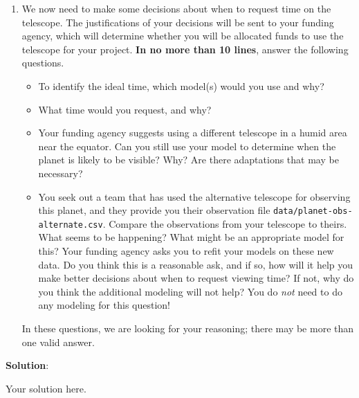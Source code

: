 \documentclass[submit]{../harvardml}
\newenvironment{solution}{
    \vspace{2mm}
    \color{blue}\noindent\textbf{Solution}:
}{}
\begin{document}
\begin{framed}
\begin{enumerate}
    \item We now need to make some decisions about when to request time on
          the telescope.  The justifications of your decisions will be sent to
          your funding agency, which will determine whether you will be
          allocated funds to use the telescope for your project. \textbf{In no more than 10 lines}, answer the following questions.
          \begin{itemize}
            \item To identify the ideal time, which model(s) would you use and why?
            \item What time would you request, and why?
            \item Your funding agency suggests using a different telescope in a
                  humid area near the equator. Can you still use your model to
                  determine when the planet is likely to be visible?  Why? Are there
                  adaptations that may be necessary?
            \item You seek out a team that has used the alternative telescope
                  for observing this planet, and they provide you their observation
                  file \verb|data/planet-obs-alternate.csv|.
                  Compare the observations from your telescope to theirs.  What
                  seems to be happening?  What might be an appropriate model for
                  this? Your funding agency asks you to refit your models on these
                  new data.  Do you think this is a reasonable ask, and if so, how
                  will it help you make better decisions about when to request
                  viewing time?  If not, why do you think the additional modeling
                  will not help? You do \emph{not} need to do any modeling for this
                  question!

          \end{itemize}
          In these questions, we are looking for your reasoning; there may be
          more than one valid answer.

  \end{enumerate}
\end{framed}

\newpage

\begin{solution}
	Your solution here.
\end{solution}

\end{document}
